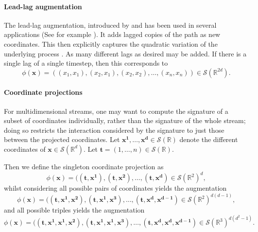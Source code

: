 \documentclass{article}
\theoremstyle{definition}
\theoremstyle{remark}
\newcommand{\reals}{\mathbb{R}}
\newcommand{\tseries}[1]{\mathcal{S}(#1)}
\begin{document}
	\paragraph{Lead-lag augmentation}

	The lead-lag augmentation, introduced by \citet{primer2016} and \citet{flint2016discretely} has been used in several applications (See for example \citet{lyons2014feature,kormilitzin2016application,yang2017leveraging}). It adds lagged copies of the path as new coordinates. This then explicitly captures the quadratic variation of the underlying process \citep{flint2016discretely}. As many different lags as desired may be added. If there is a single lag of a single timestep, then this corresponds to
	\begin{equation*}
	\phi(\mathbf{x})= ((x_1,x_1),(x_2,x_1),(x_2,x_2),\dots,(x_n,x_n)) \in \tseries{\reals^{2d}}.
	\end{equation*}
	
	\paragraph{Coordinate projections}
	For multidimensional streams, one may want to compute the signature of a subset of coordinates individually, rather than the signature of the whole stream; doing so restricts the interaction considered by the signature to just those between the projected coordinates. Let $\mathbf{x^1},\dots, \mathbf{x^d} \in \tseries{\reals}$ denote the different coordinates of $\mathbf{x}\in \tseries{\reals^d}$. Let $\mathbf{t} = (1, \ldots, n) \in \tseries{\reals}$.
	
	Then we define the singleton coordinate projection as
	\begin{equation*}
	\phi(\mathbf{x})= \big((\mathbf{t},\mathbf{x^1}),(\mathbf{t},\mathbf{x^2}),\dots,(\mathbf{t},\mathbf{x^{d}}) \in \tseries{\reals^2}^{d},
	\end{equation*}
	whilst considering all possible pairs of coordinates yields the augmentation
	\begin{equation*}
	\phi(\mathbf{x})= \big((\mathbf{t}, \mathbf{x^1},\mathbf{x^2}),(\mathbf{t}, \mathbf{x^1},\mathbf{x^3}),\dots,(\mathbf{t}, \mathbf{x^d},\mathbf{x^{d-1}}) \in \tseries{\reals^2}^{d(d-1)},
	\end{equation*}
	and all possible triples yields the augmentation
	\begin{equation*}
	\phi(\mathbf{x})= \big((\mathbf{t}, \mathbf{x^1},\mathbf{x^1},\mathbf{x^2}),(\mathbf{t}, \mathbf{x^1},\mathbf{x^1},\mathbf{x^3}),\dots,(\mathbf{t}, \mathbf{x^{d}},\mathbf{x^d},\mathbf{x^{d-1}}) \in \tseries{\reals^3}^{d(d^2-1)}.
	\end{equation*}
	
\end{document}
